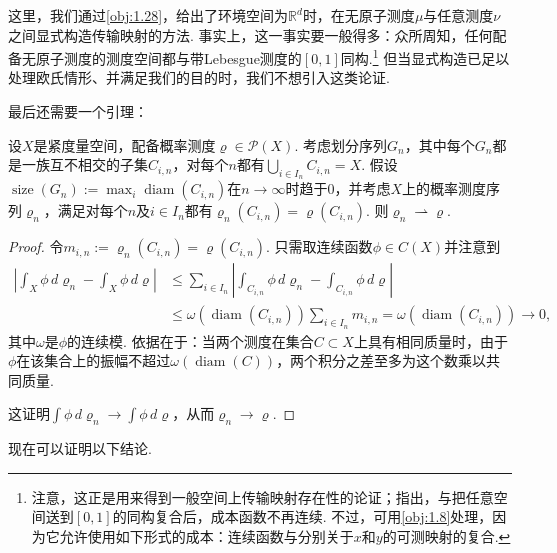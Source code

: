 \begin{remark}\label{obj:1.30}
这里，我们通过\autoref{obj:1.28}，给出了环境空间为$\mathbb R^d$时，在无原子测度$\mu$与任意测度$\nu$之间显式构造传输映射的方法. 事实上，这一事实要一般得多：众所周知，任何配备无原子测度的测度空间都与带Lebesgue测度的$[0,1]$同构.\footnote{注意，这正是\cite{b175}用来得到一般空间上传输映射存在性的论证；\cite{b253}指出，与把任意空间送到$[0,1]$的同构复合后，成本函数不再连续. 不过，可用\autoref{obj:1.8}处理，因为它允许使用如下形式的成本：连续函数与分别关于$x$和$y$的可测映射的复合.} 但当显式构造已足以处理欧氏情形、并满足我们的目的时，我们不想引入这类论证.
\end{remark}

最后还需要一个引理：

\begin{lemma}\label{obj:1.31}
设$X$是紧度量空间，配备概率测度$\varrho\in\mathscr P(X)$. 考虑划分序列$G_n$，其中每个$G_n$都是一族互不相交的子集$C_{i,n}$，对每个$n$都有$\bigcup_{i\in I_n}C_{i,n}=X$. 假设$\operatorname{size}(G_n):=\max_i\operatorname{diam}(C_{i,n})$在$n\to\infty$时趋于$0$，并考虑$X$上的概率测度序列$\varrho_n$，满足对每个$n$及$i\in I_n$都有$\varrho_n(C_{i,n})=\varrho(C_{i,n})$. 则$\varrho_n\rightharpoonup\varrho$.
\end{lemma}
\begin{proof}
令$m_{i,n}:=\varrho_n(C_{i,n})=\varrho(C_{i,n})$. 只需取连续函数$\phi\in C(X)$并注意到
\begin{equation*}
\begin{aligned}
\left|\int_X\phi\,d\varrho_n-\int_X\phi\,d\varrho\right|
&\le\sum_{i\in I_n}\left|\int_{C_{i,n}}\phi\,d\varrho_n-\int_{C_{i,n}}\phi\,d\varrho\right|\\
&\le\omega(\operatorname{diam}(C_{i,n}))\sum_{i\in I_n}m_{i,n}
=\omega(\operatorname{diam}(C_{i,n}))\to0,
\end{aligned}
\end{equation*}
其中$\omega$是$\phi$的连续模. 依据在于：当两个测度在集合$C\subset X$上具有相同质量时，由于$\phi$在该集合上的振幅不超过$\omega(\operatorname{diam}(C))$，两个积分之差至多为这个数乘以共同质量.

这证明$\int\phi\,d\varrho_n\to\int\phi\,d\varrho$，从而$\varrho_n\to\varrho$.
\end{proof}

现在可以证明以下结论.

